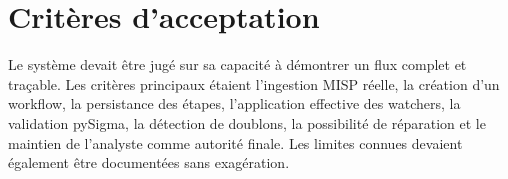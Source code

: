 \section{Critères d'acceptation}

Le système devait être jugé sur sa capacité à démontrer un flux complet et traçable. Les critères principaux étaient l'ingestion MISP réelle, la création d'un workflow, la persistance des étapes, l'application effective des watchers, la validation pySigma, la détection de doublons, la possibilité de réparation et le maintien de l'analyste comme autorité finale. Les limites connues devaient également être documentées sans exagération.
